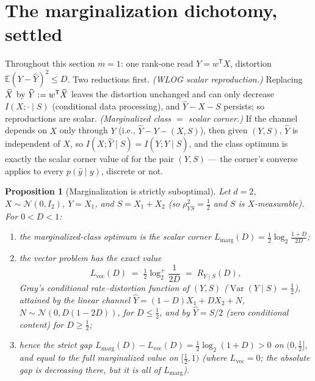\documentclass[11pt]{article}
\newtheorem{proposition}{Proposition}
\newcommand{\E}{\mathbb{E}}\newcommand{\tr}{\operatorname{tr}}
\newcommand{\hY}{\widehat Y}
\begin{document}
\section{The marginalization dichotomy, settled}\label{sec:marg}

Throughout this section $m=1$: one rank-one read $Y=w^{\mathsf T}X$,
distortion $\E(Y-\hY)^2\le D$. Two reductions first. \emph{(WLOG scalar
reproduction.)} Replacing $\widehat X$ by $\hY:=w^{\mathsf T}\hX$ leaves the
distortion unchanged and can only decrease $I(X;\cdot\mid S)$ (conditional
data processing), and $\hY-X-S$ persists; so reproductions are scalar.
\emph{(Marginalized class $=$ scalar corner.)} If the channel depends on
$X$ only through $Y$ (i.e., $\hY-Y-(X,S)$), then given $(Y,S)$, $\hY$ is
independent of $X$, so $I(X;\hY\mid S)=I(Y;\hY\mid S)$, and the class
optimum is exactly the scalar corner value of \cite{bondlandauerV} for the
pair $(Y,S)$ --- the corner's converse applies to every $p(\hat y\mid y)$,
discrete or not.

\begin{proposition}[Marginalization is strictly suboptimal]\label{prop:marg}
Let $d=2$, $X\sim\mathcal N(0,I_2)$, $Y=X_1$, and $S=X_1+X_2$ (so
$\rho^2_{YS}=\tfrac12$ and $S$ is $X$-measurable). For $0<D<1$:
\begin{enumerate}
\item[(i)] the marginalized-class optimum is the scalar corner
$L_{\mathrm{marg}}(D)=\tfrac12\log_2\!\frac{1+D}{2D}$;
\item[(ii)] the vector problem has the exact value
\[
L_{\mathrm{vec}}(D)\;=\;\tfrac12\log_2^{+}\!\frac{1}{2D}
\;=\;R_{Y\mid S}(D),
\]
Gray's conditional rate--distortion function of $(Y,S)$
($\operatorname{Var}(Y\mid S)=\tfrac12$), attained by the linear channel
$\hY=(1-D)X_1+DX_2+N$, $N\sim\mathcal N(0,D(1-2D))$, for $D\le\tfrac12$,
and by $\hY=S/2$ (zero conditional content) for $D\ge\tfrac12$;
\item[(iii)] hence the strict gap
$L_{\mathrm{marg}}(D)-L_{\mathrm{vec}}(D)=\tfrac12\log_2(1+D)>0$ on
$(0,\tfrac12]$, and equal to the full marginalized value on
$[\tfrac12,1)$ (where $L_{\mathrm{vec}}=0$; the absolute gap is decreasing
there, but it is all of $L_{\mathrm{marg}}$).
\end{enumerate}
\end{proposition}
\end{document}
